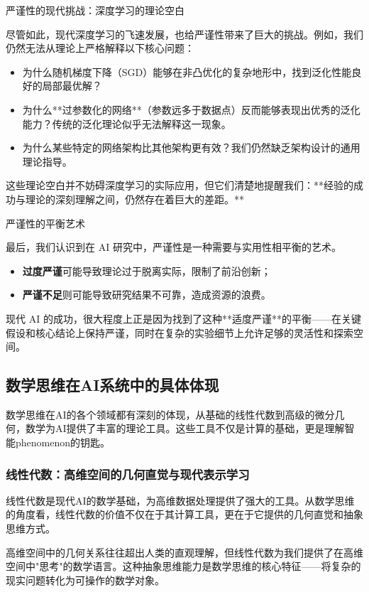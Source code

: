 严谨性的现代挑战：深度学习的理论空白

尽管如此，现代深度学习的飞速发展，也给严谨性带来了巨大的挑战。例如，我们仍然无法从理论上严格解释以下核心问题：

\begin{itemize}
\item 为什么随机梯度下降（SGD）能够在非凸优化的复杂地形中，找到泛化性能良好的局部最优解？
\item 为什么**过参数化的网络**（参数远多于数据点）反而能够表现出优秀的泛化能力？传统的泛化理论似乎无法解释这一现象。
\item 为什么某些特定的网络架构比其他架构更有效？我们仍然缺乏架构设计的通用理论指导。
\end{itemize}

这些理论空白并不妨碍深度学习的实际应用，但它们清楚地提醒我们：**经验的成功与理论的深刻理解之间，仍然存在着巨大的差距。**

严谨性的平衡艺术

最后，我们认识到在 AI 研究中，严谨性是一种需要与实用性相平衡的艺术。
\begin{itemize}
\item \textbf{过度严谨}可能导致理论过于脱离实际，限制了前沿创新；
\item \textbf{严谨不足}则可能导致研究结果不可靠，造成资源的浪费。
\end{itemize}
现代 AI 的成功，很大程度上正是因为找到了这种**适度严谨**的平衡——在关键假设和核心结论上保持严谨，同时在复杂的实验细节上允许足够的灵活性和探索空间。


\subsection{数学思维在AI系统中的具体体现}

数学思维在AI的各个领域都有深刻的体现，从基础的线性代数到高级的微分几何，数学为AI提供了丰富的理论工具。这些工具不仅是计算的基础，更是理解智能phenomenon的钥匙。

\subsubsection{线性代数：高维空间的几何直觉与现代表示学习}

线性代数是现代AI的数学基础，为高维数据处理提供了强大的工具。从数学思维的角度看，线性代数的价值不仅在于其计算工具，更在于它提供的几何直觉和抽象思维方式。

高维空间中的几何关系往往超出人类的直观理解，但线性代数为我们提供了在高维空间中"思考"的数学语言。这种抽象思维能力是数学思维的核心特征——将复杂的现实问题转化为可操作的数学对象。

